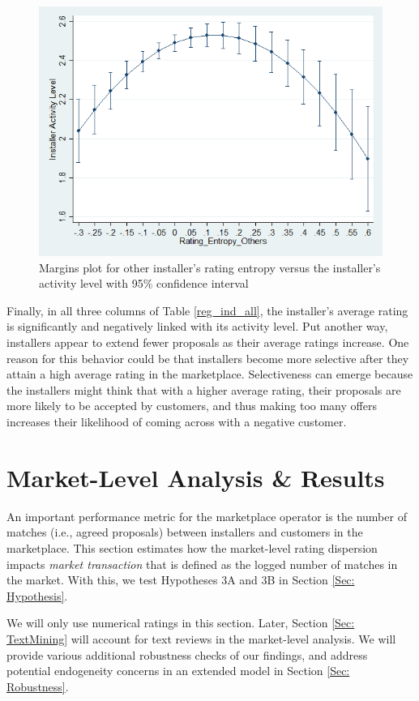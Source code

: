 \documentclass[mnsc,blindrev]{informs3}
\begin{document}
	\begin{figure}
		\centering
		\includegraphics[width=0.7\linewidth]{marginsplot_entothers.png}
		\caption{Margins plot for other installer's rating entropy versus the installer's activity level with 95\% confidence interval}
		\label{fig: marginsplot_ind_ent_others}
	\end{figure}
	
	

	
	
	Finally, in all three columns of Table \ref{reg_ind_all}, the installer's average rating is significantly and negatively linked with its activity level. Put another way, installers appear to extend fewer proposals as their average ratings increase. One reason for this behavior could be that  installers become more selective after they attain a high average rating in the marketplace. Selectiveness can emerge because the installers might think that with a higher average rating, their proposals are more likely to be accepted by customers, and thus making too many offers increases their likelihood of coming across with a negative customer.
	
	\section{Market-Level Analysis \& Results} \label{Sec: Market-level}
	
	An important performance metric for the marketplace operator is the number of matches (i.e., agreed proposals) between installers and customers in the marketplace. This section estimates how the market-level rating dispersion impacts \emph{market transaction} that is defined as the logged number of matches in the market. With this, we test Hypotheses 3A and 3B in Section \ref{Sec: Hypothesis}.
	
	We will only use numerical ratings in this section. Later, Section \ref{Sec: TextMining} will account for text reviews in the market-level analysis. We will provide various additional robustness checks of our findings, and address potential endogeneity concerns in an extended model in Section \ref{Sec: Robustness}.
	
\end{document}
